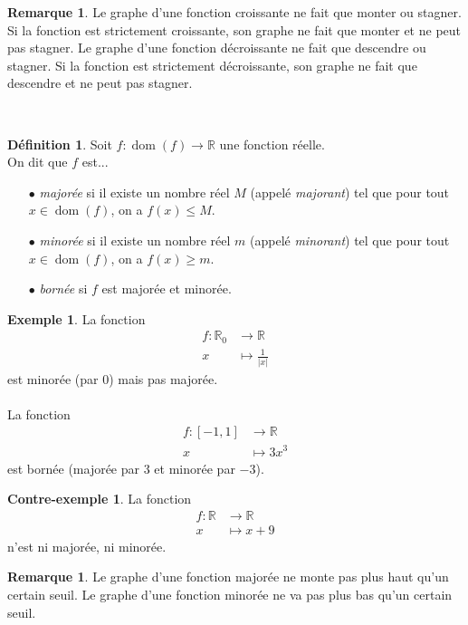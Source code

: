 \documentclass[a4paper,13pt]{scrreprt}
\theoremstyle{plain}
\theoremstyle{definition}
\newtheorem{déf}[subsection]{Définition}
\newtheorem{exe}[subsection]{Exemple}
\newtheorem{con}[subsection]{Contre-exemple}
\newtheorem{rema}[subsection]{Remarque}
\newcommand{\rr}{\mathbb{R}}
\DeclareMathOperator{\dom}{dom}
\begin{document}
\begin{rema}
	Le graphe d'une fonction croissante ne fait que monter ou stagner. Si la fonction est strictement croissante, son graphe ne fait que monter et ne peut pas stagner. Le graphe d'une fonction décroissante ne fait que descendre ou stagner. Si la fonction est strictement décroissante, son graphe ne fait que descendre et ne peut pas stagner.
\end{rema}
~~\\
\begin{déf}
	Soit $f : \dom(f) \to \rr$ une fonction réelle. \\
	On dit que $f$ est...
	\begin{itemize}
		\item [$\bullet$] \emph{majorée} si il existe un nombre réel $M$ (appelé \emph{majorant}) tel que pour tout $x \in \dom(f)$, on a $f(x) \le M$.
		\item [$\bullet$] \emph{minorée} si il existe un nombre réel $m$ (appelé \emph{minorant}) tel que pour tout $x \in \dom(f)$, on a $f(x) \ge m$.
		\item [$\bullet$] \emph{bornée} si $f$ est majorée et minorée.
	\end{itemize}
\end{déf}

\begin{exe}
	La fonction \begin{align*}
	f : {\rr}_{0} &\to \rr \\
	x &\mapsto \frac{1}{|x|}
	\end{align*}
	est minorée (par $0$) mais pas majorée. \\
	~~\\
	La fonction \begin{align*}
	f : [-1,1] &\to \rr \\
	x &\mapsto 3x^3
	\end{align*}
	est bornée (majorée par $3$ et minorée par $-3$).
\end{exe}

\begin{con}
	La fonction \begin{align*}
	f : \rr &\to \rr \\
	x &\mapsto x+9
	\end{align*}
	n'est ni majorée, ni minorée.
\end{con}

\begin{rema}
	Le graphe d'une fonction majorée ne monte pas plus haut qu'un certain seuil. Le graphe d'une fonction minorée ne va pas plus bas qu'un certain seuil.
\end{rema}
\end{document}
